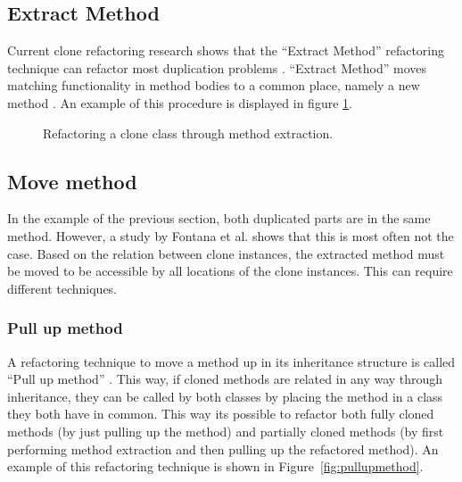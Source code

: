 \subsection{Extract Method}
Current clone refactoring research shows that the ``Extract Method'' refactoring technique can refactor most duplication problems \cite{fontana2015duplicated, tsantalis2015assessing, white2016deep}. ``Extract Method'' moves matching functionality in method bodies to a common place, namely a new method \cite{fowler2018refactoring}. An example of this procedure is displayed in figure \ref{fig:extractmethod}.

\begin{figure}[H]
\begin{parcolumns}{2}
\end{parcolumns}
\caption{Refactoring a clone class through method extraction.}
\label{fig:extractmethod}
\end{figure}

\subsection{Move method}
In the example of the previous section, both duplicated parts are in the same method. However, a study by Fontana et al. \cite{fontana2015duplicated} shows that this is most often not the case. Based on the relation between clone instances, the extracted method must be moved to be accessible by all locations of the clone instances. This can require different techniques.

\subsubsection{Pull up method}
A refactoring technique to move a method up in its inheritance structure is called ``Pull up method'' \cite{fowler2018refactoring}. This way, if cloned methods are related in any way through inheritance, they can be called by both classes by placing the method in a class they both have in common. This way its possible to refactor both fully cloned methods (by just pulling up the method) and partially cloned methods (by first performing method extraction and then pulling up the refactored method). An example of this refactoring technique is shown in Figure~\ref{fig:pullupmethod}.

